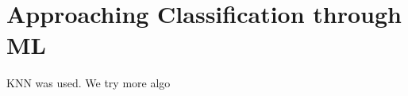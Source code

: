 \section{Approaching Classification through ML}
\label{sec:ML_concept}
KNN was used. We try more algo

